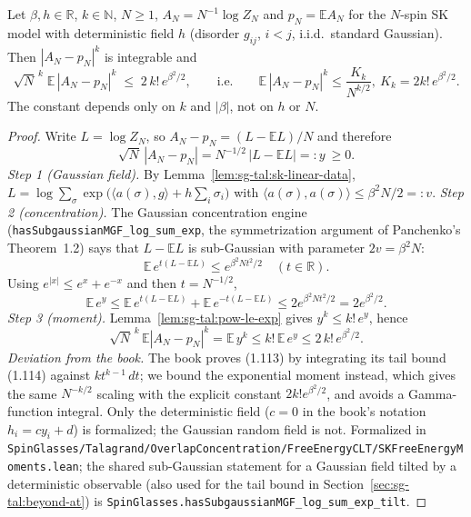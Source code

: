 \begin{theorem}\label{thm:sg-tal:free-energy-moments}
  \leanok
{}
Let $\beta,h\in\mathbb R$, $k\in\mathbb N$, $N\ge1$, $A_N=N^{-1}\log Z_N$ and $p_N=\mathbb{E}A_N$ for the $N$-spin SK model with deterministic field $h$ (disorder $g_{ij}$, $i<j$, i.i.d.\ standard Gaussian). Then $|A_N-p_N|^k$ is integrable and
\[
\sqrt N^{\,k}\;\mathbb{E}\,|A_N-p_N|^k\;\le\;2\,k!\,e^{\beta^2/2},\qquad\text{i.e.}\qquad \mathbb{E}\,|A_N-p_N|^k\le \frac{K_k}{N^{k/2}},\ K_k=2k!\,e^{\beta^2/2}.
\]
The constant depends only on $k$ and $|\beta|$, not on $h$ or $N$.
\end{theorem}
\begin{proof}
  \leanok
Write $L=\log Z_N$, so $A_N-p_N=(L-\mathbb{E}L)/N$ and therefore
\[
\sqrt N\,|A_N-p_N|=N^{-1/2}\,|L-\mathbb{E}L|=:y\ \ge0 .
\]
\emph{Step 1 (Gaussian field).} By Lemma~\ref{lem:sg-tal:sk-linear-data}, $L=\log\sum_\sigma\exp\big(\langle a(\sigma),g\rangle+h\sum_i\sigma_i\big)$ with $\langle a(\sigma),a(\sigma)\rangle\le\beta^2N/2=:v$.
\emph{Step 2 (concentration).} The Gaussian concentration engine (\texttt{hasSubgaussianMGF\_log\_sum\_exp}, the symmetrization argument of Panchenko's Theorem~1.2) says that $L-\mathbb{E}L$ is sub-Gaussian with parameter $2v=\beta^2N$:
\[
\mathbb{E}\,e^{t(L-\mathbb{E}L)}\le e^{\beta^2Nt^2/2}\quad(t\in\mathbb R).
\]
Using $e^{|x|}\le e^x+e^{-x}$ and then $t=N^{-1/2}$,
\[
\mathbb{E}\,e^{y}\le\mathbb{E}\,e^{t(L-\mathbb{E}L)}+\mathbb{E}\,e^{-t(L-\mathbb{E}L)}\le 2e^{\beta^2Nt^2/2}=2e^{\beta^2/2}.
\]
\emph{Step 3 (moment).} Lemma~\ref{lem:sg-tal:pow-le-exp} gives $y^k\le k!\,e^{y}$, hence
\[
\sqrt N^{\,k}\,\mathbb{E}|A_N-p_N|^k=\mathbb{E}\,y^k\le k!\,\mathbb{E}\,e^{y}\le 2\,k!\,e^{\beta^2/2}.
\]
\emph{Deviation from the book.} The book proves (1.113) by integrating its tail bound (1.114) against $kt^{k-1}\,dt$; we bound the exponential moment instead, which gives the same $N^{-k/2}$ scaling with the explicit constant $2k!e^{\beta^2/2}$, and avoids a Gamma-function integral. Only the deterministic field ($c=0$ in the book's notation $h_i=cy_i+d$) is formalized; the Gaussian random field is not.
Formalized in \texttt{SpinGlasses/Talagrand/OverlapConcentration/FreeEnergyCLT/SKFreeEnergyMoments.lean}; the shared sub-Gaussian statement for a Gaussian field tilted by a deterministic observable (also used for the tail bound in Section~\ref{sec:sg-tal:beyond-at}) is \texttt{SpinGlasses.hasSubgaussianMGF\_log\_sum\_exp\_tilt}.
\end{proof}

